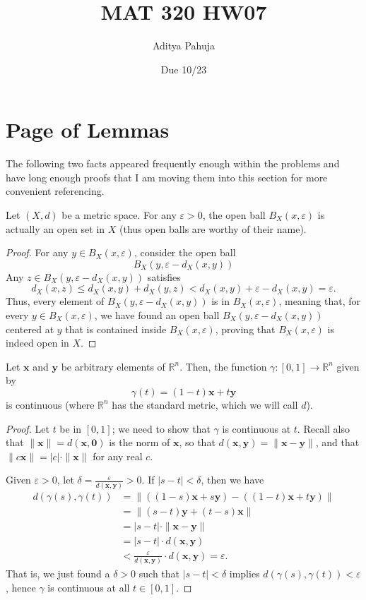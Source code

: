 \documentclass[11pt]{scrartcl}
\title{\vspace{-2em}MAT 320 HW07}
\author{\large Aditya Pahuja}
\date{\large Due 10/23}
\providecommand{\eps}{\varepsilon}
\providecommand{\RR}{\mathbb R}
\providecommand{\mb}[1]{\mathbf{#1}}
\begin{document}
\maketitle

\section{Page of Lemmas}
\renewcommand{\thelemma}{L\arabic{lemma}}
The following two facts appeared frequently enough within the problems
and have long enough proofs
that I am moving them into this section for more convenient referencing.

\begin{lemma}
	Let $(X, d)$ be a metric space.
	For any $\eps > 0$, the open ball $B_X(x, \eps)$
	is actually an open set in $X$
	(thus open balls are worthy of their name).
\end{lemma}

\begin{proof}
	For any $y\in B_X(x,\eps)$, consider the open ball
	\[B_X(y, \eps - d_X(x, y))\]
	Any $z\in B_X(y, \eps - d_X(x,y))$ satisfies
	\[d_X(x, z) \le d_X(x, y) + d_X(y, z) < d_X(x, y) + \eps - d_X(x, y)
	= \eps.\]
	Thus, every element of $B_X(y,\eps-d_X(x,y))$ is in $B_X(x,\eps)$,
	meaning that, for every $y\in B_X(x,\eps)$,
	we have found an open ball $B_X(y,\eps-d_X(x,y))$ centered at $y$
	that is contained inside $B_X(x,\eps)$,
	proving that $B_X(x,\eps)$ is indeed open in $X$.
\end{proof}

\begin{lemma}
	Let $\mb x$ and $\mb y$ be arbitrary elements of $\RR^n$.
	Then, the function $\gamma\colon[0,1]\to\RR^n$ given by
	\[\gamma(t) = (1-t)\mb x + t\mb y\]
	is continuous (where $\RR^n$ has the standard metric,
	which we will call $d$).
\end{lemma}

\begin{proof}
	Let $t$ be in $[0,1]$; we need to show that $\gamma$ is continuous at $t$.
	Recall also that $\|\mb x\| = d(\mb x, \mb 0)$ is the norm of $\mb x$,
	so that $d(\mb x, \mb y) = \|\mb x - \mb y\|$,
	and that $\|c\mb x\| = |c|\cdot\|\mb x\|$ for any real $c$.
	
	Given $\eps > 0$, let $\delta = \frac{\eps}{d(\mb x,\mb y)} > 0$.
	If $|s - t| < \delta$, then we have
	\begin{align*}
		d(\gamma(s), \gamma(t)) &=
		\|((1-s)\mb x + s\mb y) - ((1-t)\mb x + t\mb y)\|\\
		&= \|(s-t)\mb y + (t-s)\mb x\|\\
		&= |s - t|\cdot \|\mb x - \mb y\|\\
		&= |s - t|\cdot d(\mb x, \mb y)\\
		&< \frac{\eps}{d(\mb x,\mb y)}\cdot d(\mb x,\mb y) = \eps.
	\end{align*}
	That is, we just found a $\delta > 0$ such that
	$|s - t| < \delta$ implies $d(\gamma(s),\gamma(t)) < \eps$,
	hence $\gamma$ is continuous at all $t\in[0,1]$.
\end{proof}
\end{document}
